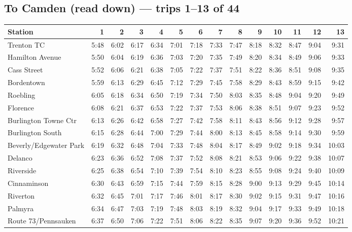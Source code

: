 \subsection*{To Camden (read down) --- trips 1--13 of 44}
\begin{center}\footnotesize\setlength{\tabcolsep}{3pt}\begin{tabular}{@{}lrrrrrrrrrrrrr@{}}\toprule
Station & 1 & 2 & 3 & 4 & 5 & 6 & 7 & 8 & 9 & 10 & 11 & 12 & 13 \\\midrule
Trenton TC & 5:48 & 6:02 & 6:17 & 6:34 & 7:01 & 7:18 & 7:33 & 7:47 & 8:18 & 8:32 & 8:47 & 9:04 & 9:31 \\
Hamilton Avenue & 5:50 & 6:04 & 6:19 & 6:36 & 7:03 & 7:20 & 7:35 & 7:49 & 8:20 & 8:34 & 8:49 & 9:06 & 9:33 \\
Cass Street & 5:52 & 6:06 & 6:21 & 6:38 & 7:05 & 7:22 & 7:37 & 7:51 & 8:22 & 8:36 & 8:51 & 9:08 & 9:35 \\
Bordentown & 5:59 & 6:13 & 6:29 & 6:45 & 7:12 & 7:29 & 7:45 & 7:58 & 8:29 & 8:43 & 8:59 & 9:15 & 9:42 \\
Roebling & 6:05 & 6:18 & 6:34 & 6:50 & 7:19 & 7:34 & 7:50 & 8:03 & 8:35 & 8:48 & 9:04 & 9:20 & 9:49 \\
Florence & 6:08 & 6:21 & 6:37 & 6:53 & 7:22 & 7:37 & 7:53 & 8:06 & 8:38 & 8:51 & 9:07 & 9:23 & 9:52 \\
Burlington Towne Ctr & 6:13 & 6:26 & 6:42 & 6:58 & 7:27 & 7:42 & 7:58 & 8:11 & 8:43 & 8:56 & 9:12 & 9:28 & 9:57 \\
Burlington South & 6:15 & 6:28 & 6:44 & 7:00 & 7:29 & 7:44 & 8:00 & 8:13 & 8:45 & 8:58 & 9:14 & 9:30 & 9:59 \\
Beverly/Edgewater Park & 6:19 & 6:32 & 6:48 & 7:04 & 7:33 & 7:48 & 8:04 & 8:17 & 8:49 & 9:02 & 9:18 & 9:34 & 10:03 \\
Delanco & 6:23 & 6:36 & 6:52 & 7:08 & 7:37 & 7:52 & 8:08 & 8:21 & 8:53 & 9:06 & 9:22 & 9:38 & 10:07 \\
Riverside & 6:25 & 6:38 & 6:54 & 7:10 & 7:39 & 7:54 & 8:10 & 8:23 & 8:55 & 9:08 & 9:24 & 9:40 & 10:09 \\
Cinnaminson & 6:30 & 6:43 & 6:59 & 7:15 & 7:44 & 7:59 & 8:15 & 8:28 & 9:00 & 9:13 & 9:29 & 9:45 & 10:14 \\
Riverton & 6:32 & 6:45 & 7:01 & 7:17 & 7:46 & 8:01 & 8:17 & 8:30 & 9:02 & 9:15 & 9:31 & 9:47 & 10:16 \\
Palmyra & 6:34 & 6:47 & 7:03 & 7:19 & 7:48 & 8:03 & 8:19 & 8:32 & 9:04 & 9:17 & 9:33 & 9:49 & 10:18 \\
Route 73/Pennsauken & 6:37 & 6:50 & 7:06 & 7:22 & 7:51 & 8:06 & 8:22 & 8:35 & 9:07 & 9:20 & 9:36 & 9:52 & 10:21 \\

\end{tabular}
\end{center}
